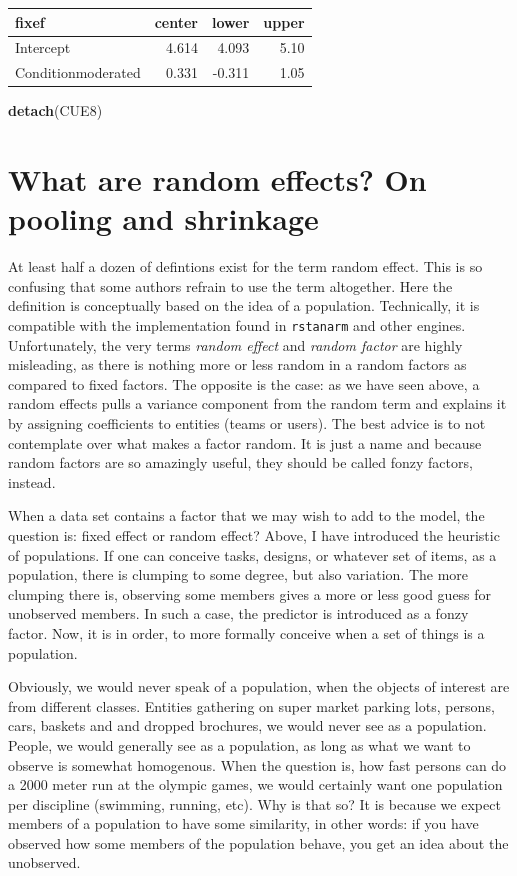\documentclass[]{svmono}
\newenvironment{Shaded}{\begin{snugshade}}{\end{snugshade}}
\newcommand{\KeywordTok}[1]{\textcolor[rgb]{0.13,0.29,0.53}{\textbf{#1}}}
\newcommand{\NormalTok}[1]{#1}
\theoremstyle{definition}
\theoremstyle{definition}
\theoremstyle{definition}
\theoremstyle{remark}
\begin{document}
\begin{longtable}[]{@{}lrrr@{}}
\toprule
fixef & center & lower & upper\tabularnewline
\midrule
\endhead
Intercept & 4.614 & 4.093 & 5.10\tabularnewline
Conditionmoderated & 0.331 & -0.311 & 1.05\tabularnewline
\bottomrule
\end{longtable}

\begin{Shaded}
\begin{Highlighting}[]
\KeywordTok{detach}\NormalTok{(CUE8)}
\end{Highlighting}
\end{Shaded}

\section{What are random effects? On pooling and
shrinkage}\label{what-are-random-effects-on-pooling-and-shrinkage}

At least half a dozen of defintions exist for the term random effect.
This is so confusing that some authors refrain to use the term
altogether. Here the definition is conceptually based on the idea of a
population. Technically, it is compatible with the implementation found
in \texttt{rstanarm} and other engines. Unfortunately, the very terms
\emph{random effect} and \emph{random factor} are highly misleading, as
there is nothing more or less random in a random factors as compared to
fixed factors. The opposite is the case: as we have seen above, a random
effects pulls a variance component from the random term and explains it
by assigning coefficients to entities (teams or users). The best advice
is to not contemplate over what makes a factor random. It is just a name
and because random factors are so amazingly useful, they should be
called fonzy factors, instead.

When a data set contains a factor that we may wish to add to the model,
the question is: fixed effect or random effect? Above, I have introduced
the heuristic of populations. If one can conceive tasks, designs, or
whatever set of items, as a population, there is clumping to some
degree, but also variation. The more clumping there is, observing some
members gives a more or less good guess for unobserved members. In such
a case, the predictor is introduced as a fonzy factor. Now, it is in
order, to more formally conceive when a set of things is a population.

Obviously, we would never speak of a population, when the objects of
interest are from different classes. Entities gathering on super market
parking lots, persons, cars, baskets and and dropped brochures, we would
never see as a population. People, we would generally see as a
population, as long as what we want to observe is somewhat homogenous.
When the question is, how fast persons can do a 2000 meter run at the
olympic games, we would certainly want one population per discipline
(swimming, running, etc). Why is that so? It is because we expect
members of a population to have some similarity, in other words: if you
have observed how some members of the population behave, you get an idea
about the unobserved.
\end{document}
